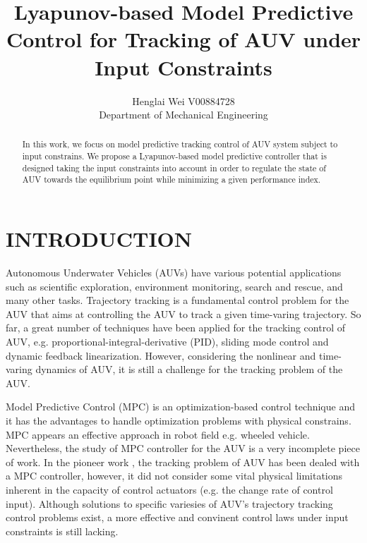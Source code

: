 \documentclass[journal,11pt,draftcls,onecolumn]{IEEEtran}
\begin{document}
\title{Lyapunov-based Model Predictive Control for Tracking of AUV under Input Constraints}

\author{Henglai Wei  V00884728\\Department of Mechanical Engineering}

\maketitle
\begin{abstract}
In this work, we focus on model predictive tracking control of AUV system subject to input constrains. We propose a Lyapunov-based model predictive controller that is designed taking the input constraints into account in order to regulate the state of AUV towards the equilibrium point while minimizing a given performance index. 
\end{abstract}
\section{INTRODUCTION}
Autonomous Underwater Vehicles (AUVs) have various potential applications such as scientific exploration, environment monitoring, search and rescue, and many other tasks\cite{fossen2002marine}.
Trajectory tracking is a fundamental control problem for the AUV that aims at controlling the AUV to track a given time-varing trajectory. So far, a great number of techniques have been applied for the tracking control of AUV, e.g. proportional-integral-derivative (PID), sliding mode control and dynamic feedback linearization. However, considering the nonlinear and time-varing dynamics of AUV, it is still a challenge for the tracking problem of the AUV.

Model Predictive Control (MPC) is an optimization-based control technique and it has the advantages to handle optimization problems with physical constrains. MPC appears an effective approach in robot field e.g. wheeled vehicle. Nevertheless, the study of MPC controller for the AUV is a very incomplete piece of work. In the pioneer work \cite{shen2017integrated}, the tracking problem of AUV has been dealed with a MPC controller, however, it did not consider some vital physical limitations inherent in the capacity of control actuators (e.g. the change rate of control input). Although solutions to specific variesies of AUV's trajectory tracking control problems exist, a more effective and convinent control laws under input constraints is still lacking. 
\end{document}
